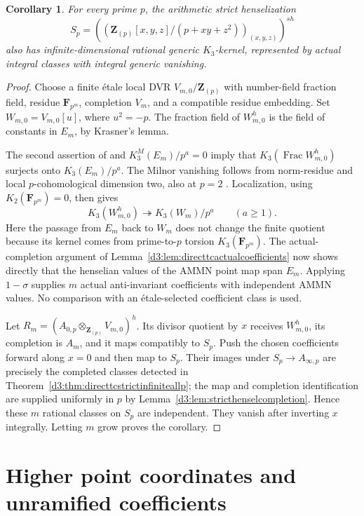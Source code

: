 \documentclass[11pt,a4paper]{amsart}
\numberwithin{equation}{section}
\newtheorem{corollary}[theorem]{Corollary}
\theoremstyle{definition}
\theoremstyle{remark}
\begin{document}
\begin{corollary}\label{d3:cor:directtcstrictarithmeticallp}
For every prime $p$, the arithmetic strict henselization
\[
 S_p=\left(\left(\mathbf Z_{(p)}[x,y,z]/(p+xy+z^2)\right)
                         _{(x,y,z)}\right)^{sh}
\]
also has infinite-dimensional rational generic $K_3$-kernel,
represented by actual integral classes with integral generic vanishing.
\end{corollary}
\begin{proof}
Choose a finite \'etale local DVR $V_{m,0}/\mathbf Z_{(p)}$ with
number-field fraction field, residue $\mathbf F_{p^m}$, completion
$V_m$, and a compatible residue embedding. Set $W_{m,0}=V_{m,0}[u]$,
where $u^2=-p$. The fraction field of $W_{m,0}^h$ is the field of
constants in $E_m$, by Krasner's lemma.

The second assertion of \cite[Theorem~4.13]{LevineIndK3} and
$K_3^M(E_m)/p^a=0$ imply that
$K_3(\operatorname{Frac}W_{m,0}^h)$ surjects onto $K_3(E_m)/p^a$.
The Milnor vanishing follows from norm-residue
\cite[VI, Theorem~4.1]{Weibel} and local
$p$-cohomological dimension two, also at $p=2$
\cite[Chapter~I, discussion preceding Theorem~2.8]{MilneDuality}. Localization, using
$K_2(\mathbf F_{p^m})=0$, then gives
\[
 K_3(W_{m,0}^h)\twoheadrightarrow K_3(W_m)/p^a
 \qquad(a\ge1).
\]
Here the passage from $E_m$ back to $W_m$ does not change the finite
quotient because its kernel comes from prime-to-$p$ torsion
$K_3(\mathbf F_{p^m})$. The actual-completion argument of
Lemma~\ref{d3:lem:directtcactualcoefficients} now shows directly that
the henselian values of the AMMN point map span $E_m$. Applying
$1-\sigma$ supplies $m$ actual anti-invariant coefficients with
independent AMMN values. No comparison with an \'etale-selected
coefficient class is used.

Let $R_m=(A_{0,p}\otimes_{\mathbf Z_{(p)}}V_{m,0})^h$.
Its divisor quotient by $x$ receives $W_{m,0}^h$, its completion is
$A_m$, and it maps compatibly to $S_p$. Push the chosen coefficients
forward along $x=0$ and then map to $S_p$. Their images under
$S_p\to A_{\infty,p}$ are precisely the completed classes detected
in Theorem~\ref{d3:thm:directtcstrictinfiniteallp}; the map and completion
identification are supplied uniformly in $p$ by
Lemma~\ref{d3:lem:stricthenselcompletion}. Hence these $m$ rational
classes on $S_p$ are independent. They vanish after inverting $x$
integrally. Letting $m$ grow proves the corollary.
\end{proof}

\section{Higher point coordinates and unramified coefficients}
\label{d3:sec:higherpointcoordinates}
\end{document}
